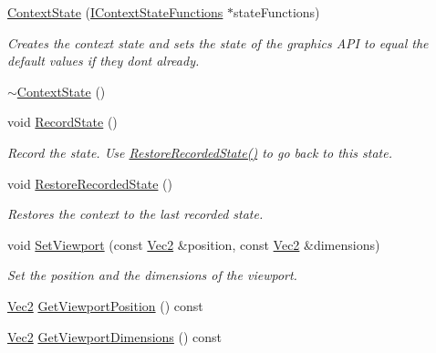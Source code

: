 \begin{DoxyCompactItemize}
\item 
\hyperlink{class_g_f_w_1_1_context_state_ad459179ac46661f8cc69e1394e4bb37a}{Context\+State} (\hyperlink{class_g_f_w_1_1_i_context_state_functions}{I\+Context\+State\+Functions} $\ast$state\+Functions)
\begin{DoxyCompactList}\small\item\em Creates the context state and sets the state of the graphics A\+PI to equal the default values if they don\textquotesingle{}t already. \end{DoxyCompactList}\item 
\hyperlink{class_g_f_w_1_1_context_state_ae40d89f70977fbbcd5da8cab7ca4458a}{$\sim$\+Context\+State} ()
\item 
void \hyperlink{class_g_f_w_1_1_context_state_a94ca9211a09c4dbe706ae462bf2cfb36}{Record\+State} ()
\begin{DoxyCompactList}\small\item\em Record the state. Use \hyperlink{class_g_f_w_1_1_context_state_a3ca74e03440f1e847a6b61a24e3730e8}{Restore\+Recorded\+State()} to go back to this state. \end{DoxyCompactList}\item 
void \hyperlink{class_g_f_w_1_1_context_state_a3ca74e03440f1e847a6b61a24e3730e8}{Restore\+Recorded\+State} ()
\begin{DoxyCompactList}\small\item\em Restores the context to the last recorded state. \end{DoxyCompactList}\item 
void \hyperlink{class_g_f_w_1_1_context_state_a5bc411cb78a13eef92a360a9c549ac41}{Set\+Viewport} (const \hyperlink{namespace_g_f_w_1_1_math_af5ba989006b289f1e575dd7a911c1521}{Vec2} \&position, const \hyperlink{namespace_g_f_w_1_1_math_af5ba989006b289f1e575dd7a911c1521}{Vec2} \&dimensions)
\begin{DoxyCompactList}\small\item\em Set the position and the dimensions of the viewport. \end{DoxyCompactList}\item 
\hyperlink{namespace_g_f_w_1_1_math_af5ba989006b289f1e575dd7a911c1521}{Vec2} \hyperlink{class_g_f_w_1_1_context_state_ab152d162bb24377f81b0bf612f1b89b7}{Get\+Viewport\+Position} () const
\item 
\hyperlink{namespace_g_f_w_1_1_math_af5ba989006b289f1e575dd7a911c1521}{Vec2} \hyperlink{class_g_f_w_1_1_context_state_aaa24b34588b2278f80354a255946f73d}{Get\+Viewport\+Dimensions} () const

\end{DoxyCompactItemize}
